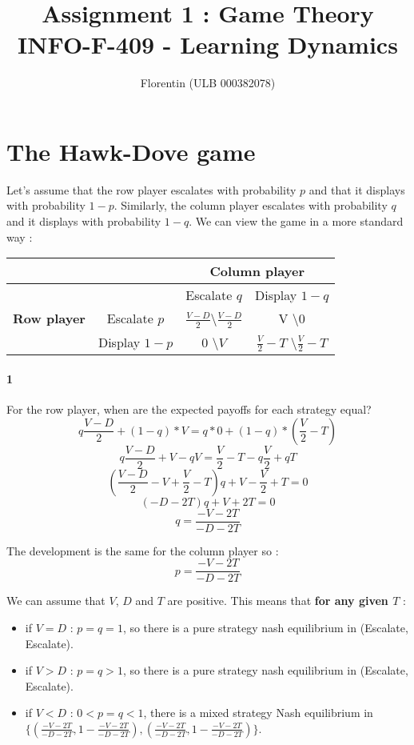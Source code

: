 \documentclass[a4paper]{article}
\title{
    Assignment 1 : Game Theory\\
    \small INFO-F-409 - Learning Dynamics
}
\author{Florentin \bsc{Hennecker} (ULB 000382078)}
\date{}
\begin{document}
\maketitle

\section{The Hawk-Dove game}
Let's assume that the row player escalates with probability $p$ and that it 
displays with probability $1-p$. Similarly, the column player escalates with 
probability $q$ and it displays with probability $1-q$. We can view the game
in a more standard way :

\begin{table}[H]
\begin{tabular}{c|c|c|c}
	& & \multicolumn{2}{c}{\textbf{Column player}} \\
	\hline
	& & Escalate $q$ & Display $1-q$ \\
	\textbf{Row player} & Escalate $p$ & 
		$\frac{V-D}{2}$\textbackslash$\frac{V-D}{2}$ & 
		V \textbackslash $0$\\
	\cline{2-3} & Display $1-p$ & $0$ \textbackslash $V$ &
		$\frac{V}{2}-T$ \textbackslash $\frac{V}{2}-T$\\
\end{tabular}
\end{table}

\paragraph{1} For the row player, when are the expected payoffs for each 
strategy equal?
$$ q\frac{V-D}{2} + (1-q)*V = q*0 + (1-q)*(\frac{V}{2}-T) $$
$$ q\frac{V-D}{2}+V-qV = \frac{V}{2}-T -q\frac{V}{2} + qT $$
$$ (\frac{V-D}{2} - V + \frac{V}{2} - T)q + V - \frac{V}{2} + T = 0 $$
$$ (-D-2T)q + V+2T = 0 $$
$$ q = \frac{-V-2T}{-D-2T} $$

The development is the same for the column player so :
$$ p = \frac{-V-2T}{-D-2T} $$

We can assume that $V$, $D$ and $T$ are positive. This means that \textbf{for
any given $T$} :
\begin{itemize}
	\item if $V = D$ : $p = q = 1$, so there is a pure 
		strategy nash equilibrium in (Escalate, Escalate).
	\item if $V > D$ : $ p = q > 1 $, so there is a pure
		strategy nash equilibrium in (Escalate,	Escalate).
	\item if $V < D$ : $ 0 < p = q < 1 $, there is a mixed strategy Nash
		equilibrium in \\
		$\{( \frac{-V-2T}{-D-2T}, 1-\frac{-V-2T}{-D-2T}), 
		( \frac{-V-2T}{-D-2T}, 1-\frac{-V-2T}{-D-2T})\}$. 
\end{itemize}
\end{document}
